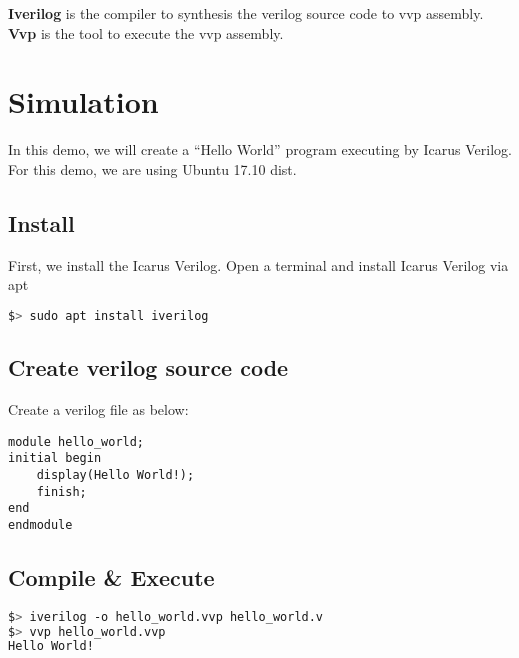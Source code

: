 \documentclass[12pt,a4paper]{article}
\begin{document}
\medskip
\textbf{Iverilog} is the compiler to synthesis the verilog source code to vvp assembly.
\textbf{Vvp} is the tool to execute the vvp assembly.

\section{Simulation}
In this demo, we will create a ``Hello World'' program executing by Icarus Verilog. For this demo, we are using Ubuntu 17.10 dist.
\subsection{Install}
First, we install the Icarus Verilog. Open a terminal and install Icarus Verilog via apt
\begin{lstlisting}[language=bash,basicstyle=\small\ttfamily,framexleftmargin=30pt,frame=single,numbers=none]
$> sudo apt install iverilog
\end{lstlisting}
\subsection{Create verilog source code}
Create a verilog file as below:
\begin{lstlisting}[style={verilog-style},frame=single,firstnumber=1,caption=hello\_world.v]
module hello_world;
initial begin
    display(Hello World!);
    finish;
end
endmodule
\end{lstlisting}
\subsection{Compile \& Execute}
\begin{lstlisting}[language=bash,basicstyle=\small\ttfamily,framexleftmargin=30pt,frame=single,numbers=none]
$> iverilog -o hello_world.vvp hello_world.v
$> vvp hello_world.vvp
Hello World!
\end{lstlisting}
\printbibliography
\end{document}
